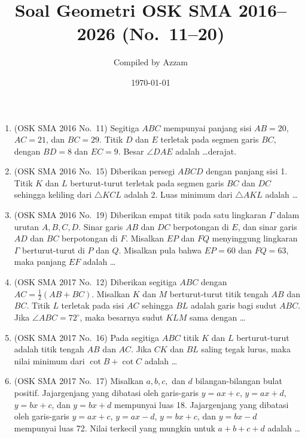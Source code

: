 \documentclass[12pt,a4paper]{article}
\title{Soal Geometri OSK SMA 2016--2026 (No.\ 11--20)}
\author{Compiled by Azzam}
\date{\today}
\begin{document}
\maketitle

\begin{enumerate}

\item (OSK SMA 2016 No.\ 11) Segitiga $ABC$ mempunyai panjang sisi $AB=20$, $AC=21$, dan $BC=29$. Titik $D$ dan $E$ terletak pada segmen garis $BC$, dengan $BD=8$ dan $EC=9$. Besar $\angle DAE$ adalah \dots derajat.

\item (OSK SMA 2016 No.\ 15) Diberikan persegi $ABCD$ dengan panjang sisi 1. Titik $K$ dan $L$ berturut-turut terletak pada segmen garis $BC$ dan $DC$ sehingga keliling dari $\triangle KCL$ adalah 2. Luas minimum dari $\triangle AKL$ adalah \dots

\item (OSK SMA 2016 No.\ 19) Diberikan empat titik pada satu lingkaran $\Gamma$ dalam urutan $A, B, C, D$. Sinar garis $AB$ dan $DC$ berpotongan di $E$, dan sinar garis $AD$ dan $BC$ berpotongan di $F$. Misalkan $EP$ dan $FQ$ menyinggung lingkaran $\Gamma$ berturut-turut di $P$ dan $Q$. Misalkan pula bahwa $EP=60$ dan $FQ=63$, maka panjang $EF$ adalah \dots

\item (OSK SMA 2017 No.\ 12) Diberikan segitiga $ABC$ dengan $AC=\frac{1}{2}(AB+BC)$. Misalkan $K$ dan $M$ berturut-turut titik tengah $AB$ dan $BC$. Titik $L$ terletak pada sisi $AC$ sehingga $BL$ adalah garis bagi sudut $ABC$. Jika $\angle ABC=72^{\circ}$, maka besarnya sudut $KLM$ sama dengan \dots

\item (OSK SMA 2017 No.\ 16) Pada segitiga $ABC$ titik $K$ dan $L$ berturut-turut adalah titik tengah $AB$ dan $AC$. Jika $CK$ dan $BL$ saling tegak lurus, maka nilai minimum dari $\cot B + \cot C$ adalah \dots

\item (OSK SMA 2017 No.\ 17) Misalkan $a, b, c,$ dan $d$ bilangan-bilangan bulat positif. Jajargenjang yang dibatasi oleh garis-garis $y=ax+c$, $y=ax+d$, $y=bx+c$, dan $y=bx+d$ mempunyai luas 18. Jajargenjang yang dibatasi oleh garis-garis $y=ax+c$, $y=ax-d$, $y=bx+c$, dan $y=bx-d$ mempunyai luas 72. Nilai terkecil yang mungkin untuk $a+b+c+d$ adalah \dots


\end{enumerate}
\end{document}
